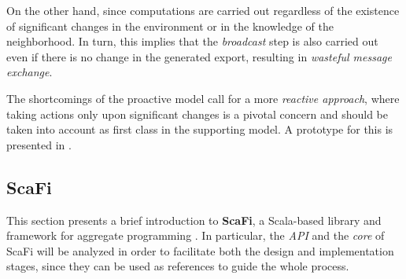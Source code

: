 On the other hand, since computations are carried out regardless of the existence of significant changes in the environment or in the knowledge of the neighborhood.
%
In turn, this implies that the \textit{broadcast} step is also carried out even if there is no change in the generated export, resulting in \textit{wasteful message exchange}.

The shortcomings of the proactive model call for a more \textit{reactive approach}, where taking actions only upon significant changes is a pivotal concern and should be taken into account as first class in the supporting model.
%
A prototype for this is presented in .

\subsection{ScaFi}

This section presents a brief introduction to \textbf{ScaFi}, a Scala-based library and framework for aggregate programming \cite{scafi-docs}.
%
In particular, the \textit{API} and the \textit{core} of ScaFi will be analyzed in order to facilitate both the design and implementation stages, since they can be used as references to guide the whole process.

